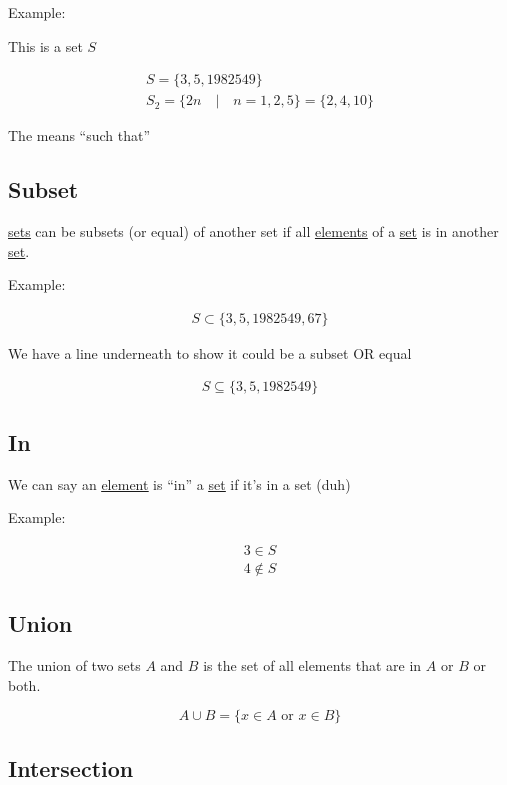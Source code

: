 \documentclass[
]{article}
\let\oldhyperref\hyperref
\renewcommand{\hyperref}[2][]{\oldhyperref[#1]{\underline{#2}}}
\begin{document}
Example:

This is a set \(S\)

\begin{gather*}
	S=\{3,5,1982549\}\\
	S_2=\{2n\quad|\quad n=1,2,5\}=\{2,4,10\}
\end{gather*}

The \textbar{} means ``such that''

\subsection{Subset}\label{subsets}

\hyperref[set]{sets}
can be subsets (or equal) of another set if all \hyperref[element]{elements} of a
\hyperref[set]{set}
is in another
\hyperref[set]{set}.

Example:

\begin{gather*}
	S\subset\{3,5,1982549,67\}
\end{gather*}

We have a line underneath to show it could be a subset OR equal

\begin{gather*}
	S\subseteq\{3,5,1982549\}
\end{gather*}

\subsection{In}\label{in}

We can say an
\hyperref[element]{element}
is ``in'' a
\hyperref[set]{set}
if it's in a set (duh)

Example:

\begin{gather*}
	3\in S\\
	4\notin S
\end{gather*}
\subsection{Union}\label{union}

The union of two sets \(A\) and \(B\) is the set of all elements that are in \(A\) or \(B\) or both.

\[
	A\cup B=\{x\in A \text{ or } x\in B\}
\]

\subsection{Intersection}\label{intersection}
\end{document}
